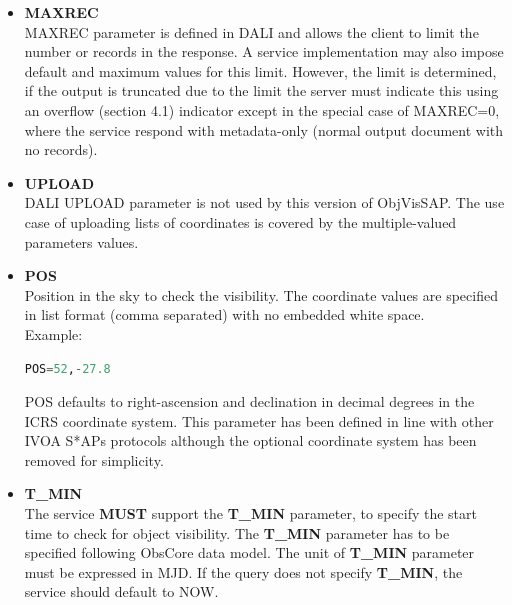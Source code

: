 \documentclass[11pt,a4paper]{ivoa}
\begin{document}
\begin{itemize}
\item{\textbf{MAXREC}\\MAXREC parameter is defined in DALI and allows
the client to limit the number or records in the response. A service
implementation may also impose default and maximum values for this limit.
However, the limit is determined, if the output is truncated due to the
limit the server must indicate this using an overflow (section 4.1)
indicator except in the special case of MAXREC=0, where the service
respond with metadata-only (normal output document with no records).}

\item{\textbf{UPLOAD}\\DALI UPLOAD parameter is not used by this version
of ObjVisSAP. The use case of uploading lists of coordinates is covered
by the multiple-valued parameters values.}

\item{\textbf{POS}\\Position in the sky to check the visibility. The coordinate
values are specified in list format (comma separated) with no embedded white
space.\\
Example:\\
\begin{lstlisting}[language=SQL]
POS=52,-27.8
\end{lstlisting}
\par
POS defaults to right-ascension and declination in decimal degrees in
the ICRS coordinate system. This parameter has been defined in line with
other IVOA S*APs protocols although the optional coordinate system has
been removed for simplicity.}

\item{\textbf{T\_MIN}\\The service \textbf{MUST }support the
\textbf{T\_MIN }parameter, to specify the start time to check for object
visibility. The \textbf{T\_MIN }parameter has to be specified following
ObsCore data model. The unit of \textbf{T\_MIN} parameter must be
expressed in MJD. If the query does not specify \textbf{T\_MIN}, the service
should default to NOW.}


\end{itemize}
\end{document}
